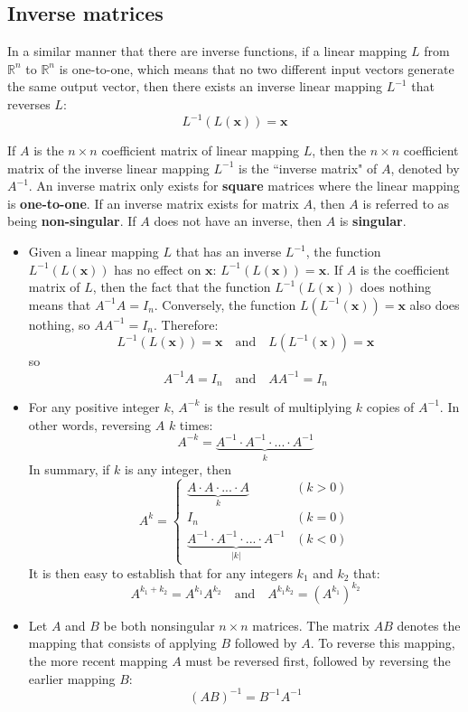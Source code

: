 \documentclass{article}
\begin{document}
\subsection*{Inverse matrices}

In a similar manner that there are inverse functions, if a linear mapping \(L\) from \(\mathbb{R}^n\) to \(\mathbb{R}^n\) is one-to-one, which means that no two different input vectors generate the same output vector, then there exists an inverse linear mapping \(L^{-1}\) that reverses \(L\): 
\[L^{-1}(L(\mathbf{x})) = \mathbf{x}\]

If \(A\) is the \(n \times n\) coefficient matrix of linear mapping \(L\), then the \(n \times n\) coefficient matrix of the inverse linear mapping \(L^{-1}\) is the ``inverse matrix" of \(A\), denoted by \(A^{-1}\). An inverse matrix only exists for {\bf square} matrices where the linear mapping is {\bf one-to-one}. If an inverse matrix exists for matrix \(A\), then \(A\) is referred to as being {\bf non-singular}. If \(A\) does not have an inverse, then \(A\) is {\bf singular}.


\begin{itemize}
\item Given a linear mapping \(L\) that has an inverse \(L^{-1}\), the function \(L^{-1}(L(\mathbf{x}))\) has no effect on \(\mathbf{x}\): \(L^{-1}(L(\mathbf{x})) = \mathbf{x}\). If \(A\) is the coefficient matrix of \(L\), then the fact that the function \(L^{-1}(L(\mathbf{x}))\) does nothing means that \(A^{-1}A = I_n\). Conversely, the function \(L(L^{-1}(\mathbf{x})) = \mathbf{x}\) also does nothing, so \(AA^{-1} = I_n\). Therefore:
\[L^{-1}(L(\mathbf{x})) = \mathbf{x} \quad\text{and}\quad L(L^{-1}(\mathbf{x})) = \mathbf{x}\]
so
\[A^{-1}A = I_n \quad\text{and}\quad AA^{-1} = I_n\]
\item For any positive integer \(k\), \(A^{-k}\) is the result of multiplying \(k\) copies of \(A^{-1}\). In other words, reversing \(A\) \(k\) times:
\[A^{-k} = \underbrace{A^{-1} \cdot A^{-1} \cdot ... \cdot A^{-1}}_k\] 
In summary, if \(k\) is any integer, then 
\[A^k = \left\{\begin{array}{cc}
\underbrace{A \cdot A \cdot ... \cdot A}_k & (k > 0) \\
I_n & (k = 0) \\
\underbrace{A^{-1} \cdot A^{-1} \cdot ... \cdot A^{-1}}_{|k|} & (k < 0)
\end{array}\right.\]
It is then easy to establish that for any integers \(k_1\) and \(k_2\) that:
\[A^{k_1 + k_2} = A^{k_1} A^{k_2} \quad\text{and}\quad A^{k_1 k_2} = (A^{k_1})^{k_2}\]
\item Let \(A\) and \(B\) be both nonsingular \(n \times n\) matrices. The matrix \(AB\) denotes the mapping that consists of applying \(B\) followed by \(A\). To reverse this mapping, the more recent mapping \(A\) must be reversed first, followed by reversing the earlier mapping \(B\):
\[(AB)^{-1} = B^{-1}A^{-1}\]  
\end{itemize}
\end{document}
